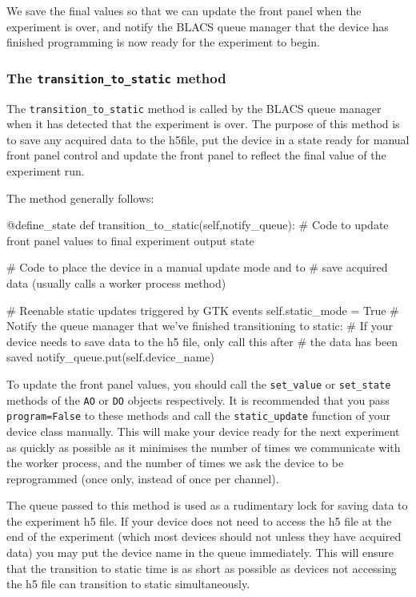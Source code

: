 \documentclass[12pt]{article}
\begin{document}
We save the final values so that we can update the front panel when the experiment is over, and notify the BLACS queue manager that the device has finished programming is now ready for the experiment to begin.

\subsubsection{The \texttt{transition\_to\_static} method}\label{device_class_transition_to_static}
The \texttt{transition\_to\_static} method is called by the BLACS queue manager when it has detected that the experiment is over. The purpose of this method is to save any acquired data to the h5file, put the device in a state ready for manual front panel control and update the front panel to reflect the final value of the experiment run.

The method generally follows:
\begin{python}
    @define_state
    def transition_to_static(self,notify_queue):
        # Code to update front panel values to final experiment output state
        
        # Code to place the device in a manual update mode and to
        # save acquired data (usually calls a worker process method)
        
        # Reenable static updates triggered by GTK events
        self.static_mode = True
        # Notify the queue manager that we've finished transitioning to static:
        # If your device needs to save data to the h5 file, only call this after
        # the data has been saved
        notify_queue.put(self.device_name)
\end{python}

To update the front panel values, you should call the \texttt{set\_value} or \texttt{set\_state} methods of the \texttt{AO} or \texttt{DO} objects respectively. It is recommended that you pass \texttt{program=False} to these methods and call the \texttt{static\_update} function of your device class manually. This will make your device ready for the next experiment as quickly as possible as it minimises the number of times we communicate with the worker process, and the number of times we ask the device to be reprogrammed (once only, instead of once per channel).

The queue passed to this method is used as a rudimentary lock for saving data to the experiment h5 file. If your device does not need to access the h5 file at the end of the experiment (which most devices should not unless they have acquired data) you may put the device name in the queue immediately. This will ensure that the transition to static time is as short as possible as devices not accessing the h5 file can transition to static simultaneously. 
\end{document}
